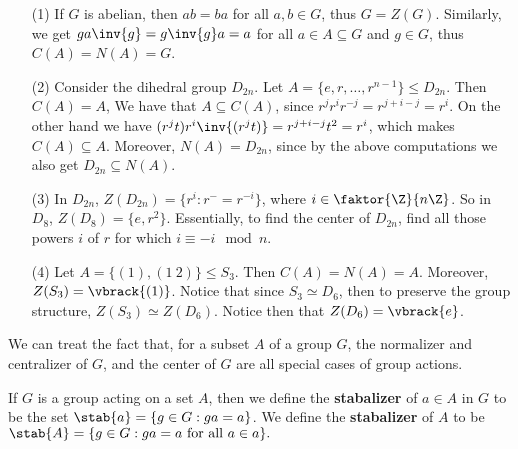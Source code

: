 \begin{example}
    \begin{enumerate}
        \item[(1)] If $G$ is abelian, then  $ab=ba$ for all  $a,b \in G$, thus
            $G=Z(G)$. Similarly, we get $ga\inv{g}=g\inv{g}a=a$ for all $a \in A
            \subseteq G$ and  $g \in G$, thus $C(A)=N(A)=G$.

        \item[(2)] Consider the dihedral group $D_{2n}$. Let $A=\{e,r, \dots,
            r^{n-1}\} \leq D_{2n}$. Then $C(A)=A$, We have that $A \subseteq
            C(A)$, since $r^jr^ir^{-j}=r^{j+i-j}=r^i$. On the other hand we have
            $(r^jt)r^i\inv{(r^jt)}=r^{j+i-j}t^2=r^i$, which makes $C(A)
            \subseteq A$. Moreover, $N(A)=D_{2n}$, since by the above
            computations we also get $D_{2n} \subseteq N(A)$.

        \item[(3)] In $D_{2n}$, $Z(D_{2n})=\{r^i : r^-=r^{-i}\}$, where $i \in
            \faktor{\Z}{n\Z}$. So in $D_8$, $Z(D_8)=\{e, r^2\}$. Essentially, to
            find the center of $D_{2n}$, find all those powers $i$ of $r$ for
            which  $i \equiv -i \mod{n}$.

        \item[(4)] Let $A=\{(1), (1 \ 2)\} \leq S_3$. Then $C(A)=N(A)=A$.
            Moreover, $Z(S_3)=\vbrack{(1)}$. Notice that since $S_3 \simeq D_6$, then
            to preserve the group structure,  $Z(S_3) \simeq Z(D_6)$. Notice
            then that $Z(D_6)=\vbrack{e}$.
    \end{enumerate}
\end{example}

We can treat the fact that, for a subset $A$ of a group  $G$, the normalizer and
centralizer of  $G$, and the center of  $G$ are all special cases of group
actions.

\begin{definition}
    If $G$ is a group acting on a set  $A$, then we define the
    \textbf{stabalizer} of $a \in A$ in $G$ to be the set  $\stab{a}=\{g \in G :
    ga=a\}$. We define the \textbf{stabalizer} of $A$ to be  $\stab{A}=\{g \in G
: ga=a \text{ for all } a \in a\}.$
\end{definition}

